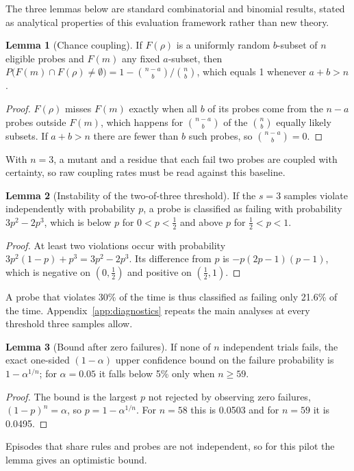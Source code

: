 \documentclass[10pt]{article}
\theoremstyle{definition}
\newtheorem{lemma}{Lemma}
\begin{document}
The three lemmas below are standard combinatorial and binomial results, stated as analytical properties of this evaluation framework rather than new theory.

\begin{lemma}[Chance coupling]
If $F(\rho)$ is a uniformly random $b$-subset of $n$ eligible probes and $F(m)$ any fixed $a$-subset, then $P\big(F(m)\cap F(\rho)\neq\emptyset\big)=1-\binom{n-a}{b}\big/\binom{n}{b}$, which equals 1 whenever $a+b>n$.
\end{lemma}
\begin{proof}
$F(\rho)$ misses $F(m)$ exactly when all $b$ of its probes come from the $n-a$ probes outside $F(m)$, which happens for $\binom{n-a}{b}$ of the $\binom{n}{b}$ equally likely subsets. If $a+b>n$ there are fewer than $b$ such probes, so $\binom{n-a}{b}=0$.
\end{proof}
With $n=3$, a mutant and a residue that each fail two probes are coupled with certainty, so raw coupling rates must be read against this baseline.

\begin{lemma}[Instability of the two-of-three threshold]
If the $s=3$ samples violate independently with probability $p$, a probe is classified as failing with probability $3p^2-2p^3$, which is below $p$ for $0<p<\tfrac12$ and above $p$ for $\tfrac12<p<1$.
\end{lemma}
\begin{proof}
At least two violations occur with probability $3p^2(1-p)+p^3=3p^2-2p^3$. Its difference from $p$ is $-p(2p-1)(p-1)$, which is negative on $(0,\tfrac12)$ and positive on $(\tfrac12,1)$.
\end{proof}
A probe that violates 30\% of the time is thus classified as failing only 21.6\% of the time. Appendix~\ref{app:diagnostics} repeats the main analyses at every threshold three samples allow.

\begin{lemma}[Bound after zero failures]
If none of $n$ independent trials fails, the exact one-sided $(1-\alpha)$ upper confidence bound on the failure probability is $1-\alpha^{1/n}$; for $\alpha=0.05$ it falls below 5\% only when $n\ge 59$.
\end{lemma}
\begin{proof}
The bound is the largest $p$ not rejected by observing zero failures, $(1-p)^n=\alpha$, so $p=1-\alpha^{1/n}$. For $n=58$ this is 0.0503 and for $n=59$ it is 0.0495.
\end{proof}
Episodes that share rules and probes are not independent, so for this pilot the lemma gives an optimistic bound.
\end{document}
